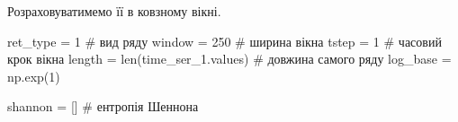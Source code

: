 \documentclass[
  letterpaper,
]{report}
\newenvironment{Shaded}{\begin{snugshade}}{\end{snugshade}}
\newcommand{\BuiltInTok}[1]{\textcolor[rgb]{0.00,0.23,0.31}{#1}}
\newcommand{\CommentTok}[1]{\textcolor[rgb]{0.37,0.37,0.37}{#1}}
\newcommand{\DecValTok}[1]{\textcolor[rgb]{0.68,0.00,0.00}{#1}}
\newcommand{\NormalTok}[1]{\textcolor[rgb]{0.00,0.23,0.31}{#1}}
\newcommand{\OperatorTok}[1]{\textcolor[rgb]{0.37,0.37,0.37}{#1}}
\begin{document}
Розраховуватимемо її в ковзному вікні.

\begin{Shaded}
\begin{Highlighting}[]
\NormalTok{ret\_type }\OperatorTok{=} \DecValTok{1}                      \CommentTok{\# вид ряду}
\NormalTok{window }\OperatorTok{=} \DecValTok{250}                      \CommentTok{\# ширина вікна}
\NormalTok{tstep }\OperatorTok{=} \DecValTok{1}                         \CommentTok{\# часовий крок вікна }
\NormalTok{length }\OperatorTok{=} \BuiltInTok{len}\NormalTok{(time\_ser\_1.values)   }\CommentTok{\# довжина самого ряду  }
\NormalTok{log\_base }\OperatorTok{=}\NormalTok{ np.exp(}\DecValTok{1}\NormalTok{)      }

\NormalTok{shannon }\OperatorTok{=}\NormalTok{ []                      }\CommentTok{\# ентропія Шеннона}
\end{Highlighting}
\end{Shaded}
\end{document}
